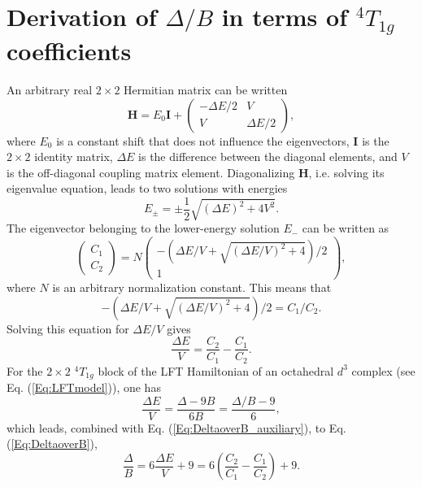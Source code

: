 \section{Derivation of $\Delta/B$ in terms of $^4T_{1g}$ coefficients}
\label{Sec:appendix_derivationDeltaoverB}
An arbitrary real $2 \times 2$ Hermitian matrix can be written
	\begin{equation}
	{\mathbf{H}} = {E_0}{\mathbf{I}} + \left( {\begin{array}{*{20}{c}}
  { - \Delta E/2}&V \\ 
  V&{\Delta E/2} 
\end{array}} \right),
\end{equation}
where ${E_0}$ is a constant shift that does not influence the eigenvectors, ${\mathbf{I}}$ is the $2 \times 2$ identity matrix, $\Delta E$ is the difference between the diagonal elements, and $V$ is the off-diagonal coupling matrix element. Diagonalizing ${\mathbf{H}}$, i.e. solving its eigenvalue equation, leads to two solutions with energies
	\begin{equation}
	{E_ \pm } =  \pm \frac{1}{2}\sqrt {{{(\Delta E)}^2} + 4{V^2}} .
	\end{equation}
The eigenvector belonging to the lower-energy solution ${E_ - }$ can be written as
	\begin{equation}
	\left( {\begin{array}{*{20}{c}}
  {{C_1}} \\ 
  {{C_2}} 
\end{array}} \right) = N\left( {\begin{array}{*{20}{c}}
  { - (\Delta E/V + \sqrt {{{(\Delta E/V)}^2} + 4} )/2} \\ 
  1 
\end{array}} \right),
\end{equation}
where $N$ is an arbitrary normalization constant. This means that
	\begin{equation}
	 - (\Delta E/V + \sqrt {{{(\Delta E/V)}^2} + 4} )/2 = {C_1}/{C_2}.
	 \end{equation}
Solving this equation for $\Delta E/V$ gives
	\begin{equation}
	\label{Eq:DeltaoverB_auxiliary}
	\frac{{\Delta E}}{V} = \frac{{{C_2}}}{{{C_1}}} - \frac{{{C_1}}}{{{C_2}}}.
	\end{equation}
For the $2 \times 2$ $^4T_{1g}$ block of the LFT Hamiltonian of an octahedral $d^3$ complex (see Eq. (\ref{Eq:LFTmodel})), one has
	\begin{equation}
	\frac{{\Delta E}}{V} = \frac{{\Delta  - 9B}}{{6B}} = \frac{{\Delta /B - 9}}{6},
	\end{equation}
which leads, combined with Eq. (\ref{Eq:DeltaoverB_auxiliary}), to Eq. (\ref{Eq:DeltaoverB}),
	\begin{equation}
	\frac{\Delta }{B} = 6\frac{{\Delta E}}{V} + 9 = 6\left( {\frac{{{C_2}}}{{{C_1}}} - \frac{{{C_1}}}{{{C_2}}}} \right) + 9.
	\end{equation}
	
